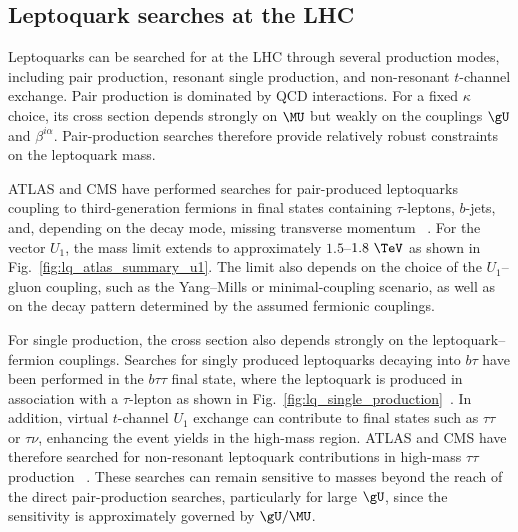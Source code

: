 \subsection{Leptoquark searches at the LHC}
\label{subsec:lq_searches_lhc}

Leptoquarks can be searched for at the LHC through several production modes, including pair production, resonant single production, and non-resonant $t$-channel exchange. Pair production is dominated by QCD interactions. For a fixed $\kappa$ choice, its cross section depends strongly on $\MU$ but weakly on the couplings $\gU$ and $\beta^{i\alpha}$. Pair-production searches therefore provide relatively robust constraints on the leptoquark mass.

ATLAS and CMS have performed searches for pair-produced leptoquarks coupling
to third-generation fermions in final states containing $\tau$-leptons,
$b$-jets, and, depending on the decay mode, missing transverse momentum
~\cite{ATLAS2023LQBTau,CMS2021LQThirdGen}.
For the vector $U_{1}$, the mass limit extends to approximately
$1.5$--$1.8~\TeV$ as shown in Fig.~\ref{fig:lq_atlas_summary_u1}. The limit also depends on the choice of the $U_{1}$--gluon coupling, such as the Yang--Mills or minimal-coupling scenario, as well as on the decay pattern determined by the assumed fermionic couplings.

For single production, the cross section also depends strongly on the leptoquark--fermion couplings. Searches for singly produced leptoquarks decaying into $b\tau$ have been performed in the $b\tau\tau$ final state, where the leptoquark is produced in association with a $\tau$-lepton as shown in Fig.~\ref{fig:lq_single_production}~\cite{ATLAS2023LQBTau,CMS2024LQBTau}. In addition, virtual $t$-channel $U_1$ exchange can contribute to final states such as $\tau\tau$ or $\tau\nu$, enhancing the event yields in the high-mass region. ATLAS and CMS have therefore searched for non-resonant leptoquark contributions in high-mass $\tau\tau$ production ~\cite{CMS2024LQBTau,ATLAS2025HighMassTauTau,CMS2023TauTauLQ}. These searches can remain sensitive to masses beyond the reach of the direct pair-production searches, particularly for large $\gU$, since the sensitivity is approximately governed by $\gU/\MU$.

